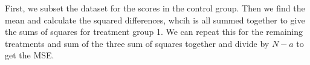 \documentclass[
  letterpaper,
  DIV=11,
  numbers=noendperiod,
  oneside]{scrreprt}
\newenvironment{Shaded}{\begin{snugshade}}{\end{snugshade}}
\newcommand{\CommentTok}[1]{\textcolor[rgb]{0.37,0.37,0.37}{#1}}
\newcommand{\DecValTok}[1]{\textcolor[rgb]{0.68,0.00,0.00}{#1}}
\newcommand{\FunctionTok}[1]{\textcolor[rgb]{0.28,0.35,0.67}{#1}}
\newcommand{\NormalTok}[1]{\textcolor[rgb]{0.00,0.23,0.31}{#1}}
\newcommand{\OtherTok}[1]{\textcolor[rgb]{0.00,0.23,0.31}{#1}}
\newcommand{\SpecialCharTok}[1]{\textcolor[rgb]{0.37,0.37,0.37}{#1}}
\newcommand{\StringTok}[1]{\textcolor[rgb]{0.13,0.47,0.30}{#1}}
\begin{document}
\begin{Shaded}
\end{Shaded}

First, we subset the dataset for the scores in the control group. Then
we find the mean and calculate the squared differences, whcih is all
summed together to give the sums of squares for treatment group 1. We
can repeat this for the remaining treatments and sum of the three sum of
squares together and divide by \(N-a\) to get the MSE.
\end{document}

